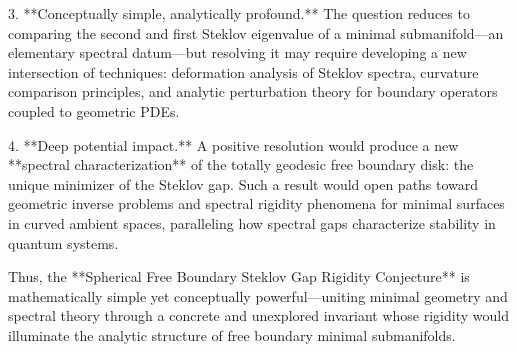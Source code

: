 3. **Conceptually simple, analytically profound.**  
   The question reduces to comparing the second and first Steklov eigenvalue of a minimal submanifold—an elementary spectral datum—but resolving it may require developing a new intersection of techniques: deformation analysis of Steklov spectra, curvature comparison principles, and analytic perturbation theory for boundary operators coupled to geometric PDEs.

4. **Deep potential impact.**  
   A positive resolution would produce a new **spectral characterization** of the totally geodesic free boundary disk: the unique minimizer of the Steklov gap. Such a result would open paths toward geometric inverse problems and spectral rigidity phenomena for minimal surfaces in curved ambient spaces, paralleling how spectral gaps characterize stability in quantum systems.

Thus, the **Spherical Free Boundary Steklov Gap Rigidity Conjecture** is mathematically simple yet conceptually powerful—uniting minimal geometry and spectral theory through a concrete and unexplored invariant whose rigidity would illuminate the analytic structure of free boundary minimal submanifolds.